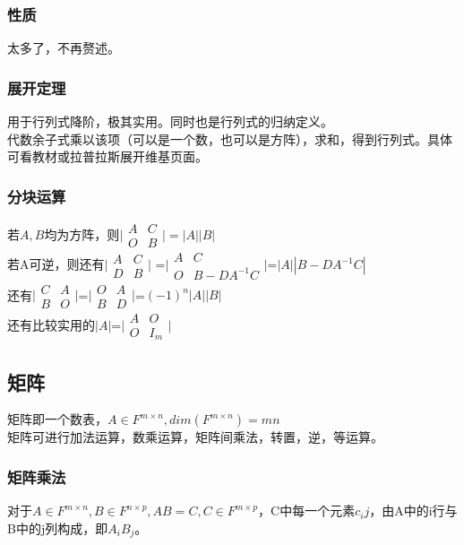 \documentclass[UTF8]{ctexart}
\begin{document}
\subsubsection{性质}
太多了，不再赘述。
\subsubsection{展开定理}
用于行列式降阶，极其实用。同时也是行列式的归纳定义。\\
\indent
代数余子式乘以该项（可以是一个数，也可以是方阵），求和，得到行列式。具体可看教材或拉普拉斯展开维基页面。
\subsubsection{分块运算}
若$A,B$均为方阵，则$\bigl| \begin{smallmatrix} A & C \\ \mathit{O} & B \end{smallmatrix} \bigr|=|A||B|$\\
\indent
若A可逆，则还有$\bigl | \begin{smallmatrix}A&C \\ D&B\end{smallmatrix}\bigr |$ =$\bigl | \begin{smallmatrix}A&C\\\mathit{O}&B-DA^{-1}C \end{smallmatrix}\bigr|$=$|A||B-DA^{-1}C|$\\
\indent
还有$\bigl | \begin{smallmatrix}C&A\\B&\mathit{O}\end{smallmatrix}\bigr |$=$\bigl | \begin{smallmatrix}\mathit{O}&A\\B&D \end{smallmatrix}\bigr |$=$(-1)^{n}|A||B|$\\
\indent
还有比较实用的$|A|$=$\bigl | \begin{smallmatrix}A&\mathit{O}\\\mathit{O}&I_{m}\end{smallmatrix}\bigr |$
\subsection{矩阵}
矩阵即一个数表，$A\in F^{m\times n},dim(F^{m\times n})=mn$\\
\indent
矩阵可进行加法运算，数乘运算，矩阵间乘法，转置，逆，等运算。
\subsubsection{矩阵乘法}
对于$A\in F^{m\times n},B\in F^{n\times p},AB=C,C\in F^{m\times p}$，C中每一个元素$c_ij$，由A中的i行与B中的j列构成，即$A_iB_j$。
\end{document}
